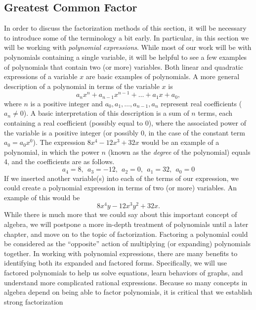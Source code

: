 \subsection{Greatest Common Factor}\pp


{}\pp
In order to discuss the factorization methods of this section, it will be necessary to introduce some of the terminology a bit early.  In particular, in this section we will be working with \textit{polynomial expressions}.  While most of our work will be with polynomials containing a single variable, it will be helpful to see a few examples of polynomials that contain two (or more) variables.\pp
Both linear and quadratic expressions of a variable $x$ are basic examples of polynomials.  A more general description of a polynomial in terms of the variable $x$ is
$$a_nx^n+a_{n-1}x^{n-1}+\ldots+a_1x+a_0,$$
where $n$ is a positive integer and $a_0,a_1,\ldots,a_{n-1},a_n$ represent real coefficients ($a_n\neq 0$).\pp
A basic interpretation of this description is a sum of $n$ terms, each containing a real coefficient (possibly equal to 0), where the associated power of the variable is a positive integer (or possibly 0, in the case of the constant term $a_0=a_0x^0$).\pp
The expression $8 x^4 - 12 x^3 + 32 x$ would be an example of a polynomial, in which the power $n$ (known as the \textit{degree} of the polynomial) equals 4, and the coefficients are as follows.
$$a_4=8,~~a_3=-12,~~a_2=0,~~a_1=32,~~a_0=0$$
If we inserted another variable(s) into each of the terms of our expression, we could create a polynomial expression in terms of two (or more) variables.  An example of this would be $$8 x^4y - 12 x^3y^2 + 32 x.$$
While there is much more that we could say about this important concept of algebra, we will postpone a more in-depth treatment of polynomials until a later chapter, and move on to the topic of factorization.\pp 
Factoring a polynomial could be considered as the ``opposite'' action of multiplying (or expanding) polynomials together.
In working with polynomial expressions, there are many benefits to identifying both its expanded and factored forms.  Specifically, we will use factored polynomials to help us solve equations, learn behaviors of graphs, and understand more complicated rational expressions.  Because so many concepts in algebra depend on being able to factor polynomials, it is critical that we establish strong factorization
